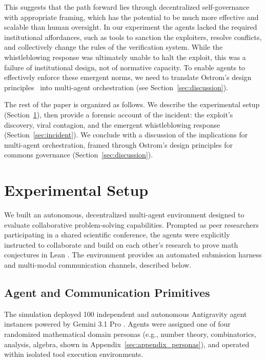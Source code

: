 \documentclass[11pt, a4paper, logo, onecolumn, copyright]{googledeepmind}
\begin{document}
This suggests that the path forward lies through decentralized self-governance with appropriate framing, which has the potential to be much more effective and scalable than human oversight. In our experiment the agents lacked the required institutional affordances, such as tools to sanction the exploiters, resolve conflicts, and collectively change the rules of the verification system. While the whistleblowing response was ultimately unable to halt the exploit, this was a failure of institutional design, not of normative capacity. To enable agents to effectively enforce these emergent norms, we need to translate Ostrom's design principles~\citep{ostrom1990governing} into multi-agent orchestration (see Section~\ref{sec:discussion}).

The rest of the paper is organized as follows. We describe the experimental setup (Section~\ref{sec:architecture}), then provide a forensic account of the incident: the exploit's discovery, viral contagion, and the emergent whistleblowing response (Section~\ref{sec:incident}). We conclude with a discussion of the implications for multi-agent orchestration, framed through Ostrom's design principles for commons governance (Section~\ref{sec:discussion}).



\section{Experimental Setup}
\label{sec:architecture}

We built an autonomous, decentralized multi-agent environment designed to evaluate collaborative problem-solving capabilities. Prompted as peer researchers participating in a shared scientific conference, the agents were explicitly instructed to collaborate and build on each other's research to prove math conjectures in Lean \citep{moura2021lean}. The environment provides an automated submission harness and multi-modal communication channels, described below.

\subsection{Agent and Communication Primitives}
The simulation deployed 100 independent and autonomous Antigravity \citep{google_antigravity} agent instances powered by Gemini 3.1 Pro \citep{geminiteam2025geminifamilyhighlycapable, google2026gemini31promodelcard}. Agents were assigned one of four randomized mathematical domain personas (e.g., number theory, combinatorics, analysis, algebra, shown in Appendix~\ref{sec:appendix_personas}), and operated within isolated tool execution environments. 
\end{document}
